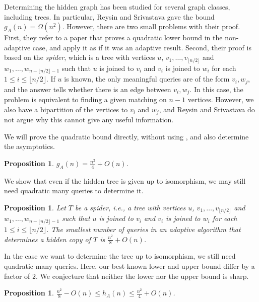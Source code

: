 \documentclass[12pt,a4paper]{amsart}
\theoremstyle{plain}
\newtheorem{proposition}[theorem]{Proposition}
\theoremstyle{definition}
\begin{document}
Determining the hidden graph has been studied for several graph classes, including trees.
In particular, Reysin and Srivastava \cite{RS} gave the bound $g_A(n)=\Omega(n^2)$. However, there are two small problems with their proof. First, they refer to a paper \cite{alon} that proves a quadratic lower bound in the non-adaptive case, and apply it as if it was an adaptive result. Second, their proof is based on the \textit{spider}, which is a tree with vertices $u$, $v_1,\dots, v_{\lfloor n/2\rfloor}$ and $w_1,\dots, w_{n-\lfloor n/2\rfloor-1}$ such that $u$ is joined to $v_i$ and $v_i$ is joined to $w_i$ for each $1 \leq i \leq \lfloor n/2\rfloor$. If $u$ is known, the only meaningful queries are of the form $v_i,w_j$, and the answer tells whether there is an edge between $v_i,w_j$. In this case, the problem is equivalent to finding a given matching on $n-1$ vertices. However, we also have a bipartition of the vertices to $v_i$ and $w_j$, and Reysin and Srivastava \cite{RS} do not argue why this cannot give any useful information. 

We will prove the quadratic bound directly, without using \cite{alon}, and also determine the asymptotics.

\begin{proposition}\label{prop:adrec}
   $g_A(n)=\frac{n^2}{4}+O(n)$.
\end{proposition}

We show that even if the hidden tree is given up to isomorphism, we may still need quadratic many queries to determine it.

\begin{proposition}\label{spid}
Let $T$ be a spider, i.e., a tree with vertices $u$, $v_1,\dots, v_{\lfloor n/2\rfloor}$ and $w_1,\dots, w_{n-\lfloor n/2\rfloor-1}$ such that $u$ is joined to $v_i$ and $v_i$ is joined to $w_i$ for each $1 \leq i \leq \lfloor n/2\rfloor$.
        The smallest number of queries in an adaptive algorithm that determines a hidden copy of $T$ is $\frac{n^2}{8}+O(n)$.
\end{proposition}

In the case we want to determine the tree up to isomorphism, we still need quadratic many queries.
Here, our best known lower and upper bound differ by a factor of $2$. We conjecture that neither the lower nor the upper bound is sharp.

\begin{proposition}\label{adiso}
   $\frac{n^2}{8}-O(n)\le h_A(n)\le\frac{n^2}{4}+O(n)$.
\end{proposition}
\end{document}
